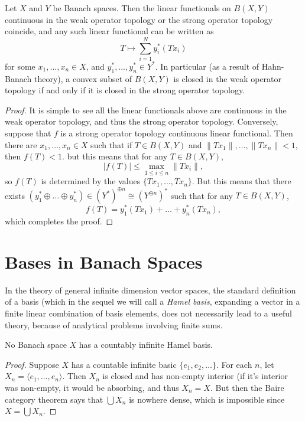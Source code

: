 \begin{theorem}
    Let $X$ and $Y$ be Banach spaces. Then the linear functionals on $B(X,Y)$ continuous in the weak operator topology or the strong operator topology coincide, and any such linear functional can be written as
    \[ T \mapsto \sum_{i = 1}^N y_i^*(Tx_i) \]
    for some $x_1,\dots,x_n \in X$, and $y_1^*, \dots, y_n^* \in Y^*$. In particular (as a result of Hahn-Banach theory), a convex subset of $B(X,Y)$ is closed in the weak operator topology if and only if it is closed in the strong operator topology.
\end{theorem}
\begin{proof}
    It is simple to see all the linear functionals above are continuous in the weak operator topology, and thus the strong operator topology. Conversely, suppose that $f$ is a strong operator topology continuous linear functional. Then there are $x_1,\dots,x_n \in X$ such that if $T \in B(X,Y)$ and $\| Tx_1 \|, \dots, \| Tx_n \| < 1$, then $f(T) < 1$. but this means that for any $T \in B(X,Y)$,
    \[ |f(T)| \leq \max_{1 \leq i \leq n} \| Tx_i \|, \]
    so $f(T)$ is determined by the values $\{ Tx_1, \dots, Tx_n \}$. But this means that there exists $(y_1^* \oplus \dots \oplus y_n^*) \in (Y^*)^{\oplus n} \cong (Y^{\oplus n})^*$ such that for any $T \in B(X,Y)$,
    \[ f(T) = y_1^*(Tx_1) + \dots + y_n^*(Tx_n), \]
    which completes the proof.
\end{proof}

















\section{Bases in Banach Spaces}

In the theory of general infinite dimension vector spaces, the standard definition of a basis (which in the sequel we will call a \emph{Hamel basis}, expanding a vector in a finite linear combination of basis elements, does not necessarily lead to a useful theory, because of analytical problems involving finite sums.

\begin{theorem}
    No Banach space $X$ has a countably infinite Hamel basis.
\end{theorem}
\begin{proof}
    Suppose $X$ has a countable infinite basic $\{ e_1, e_2, \dots \}$. For each $n$, let $X_n = \langle e_1, \dots, e_n \rangle$. Then $X_n$ is closed and has non-empty interior (if it's interior was non-empty, it would be absorbing, and thus $X_n = X$. But then the Baire category theorem says that $\bigcup X_n$ is nowhere dense, which is impossible since $X = \bigcup X_n$.
\end{proof}

